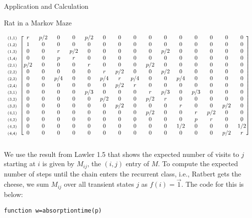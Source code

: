 \documentclass[12pt]{article}
\newcommand{\matindex}[1]{\mbox{\scriptsize#1}}
\numberwithin{equation}{section}
\begin{document}
\begin{section}{Application and Calculation}
\begin{subsection}{Rat in a Markov Maze}
\begin{enumerate}
\[{\begin{blockarray}{cccccccccccccccc}
        \begin{block}{c[ccccccccccccccc]}
        \matindex{(1,1)}&r&p/2&0&0&p/2&0&0&0&0&0&0&0&0&0&0\\
        \matindex{(1,2)}&1&0&0&0&0&0&0&0&0&0&0&0&0&0&0\\
        \matindex{(1,3)}&0&0&r&p/2&0&0&0&0&0&p/2&0&0&0&0&0\\
        \matindex{(1,4)}&0&0&p&r&0&0&0&0&0&0&0&0&0&0&0\\
        \matindex{(2,1)}&p/2&0&0&0&r&0&0&0&p/2&0&0&0&0&0&0\\
        \matindex{(2,2)}&0&0&0&0&0&r&p/2&0&0&p/2&0&0&0&0&0\\
        \matindex{(2,3)}&0&0&p/4&0&0&p/4&r&p/4&0&0&p/4&0&0&0&0\\
        \matindex{(2,4)}&0&0&0&0&0&0&p/2&r&0&0&0&0&0&0&0\\
        \matindex{(3,1)}&0&0&0&0&p/3&0&0&0&r&p/3&0&p/3&0&0&0\\
        \matindex{(3,2)}&0&0&0&0&0&p/2&0&0&p/2&r&0&0&0&0&0\\
        \matindex{(3,3)}&0&0&0&0&0&0&p/2&0&0&0&r&0&0&p/2&0\\
        \matindex{(4,1)}&0&0&0&0&0&0&0&0&p/2&0&0&r&p/2&0&0\\
        \matindex{(4,2)}&0&0&0&0&0&0&0&0&0&0&0&p&r&0&0\\
        \matindex{(4,3)}&0&0&0&0&0&0&0&0&0&0&1/2&0&0&0&1/2\\
        \matindex{(4,4)}&0&0&0&0&0&0&0&0&0&0&0&0&0&p/2&r\\
        \end{block}
        \end{blockarray}}\]

We use the result from Lawler 1.5 that shows the expected number of visits to $j$ starting at $i$ is given by $M_{ij}$, the $(i,j)$ entry of $M$. To compute the expected number of steps until the chain enters the recurrent class, i.e., Ratbert gets the cheese, we sum $M_{ij}$ over all transient states $j$ as $f(i)=\vec{1}$. The code for this is below:
\begin{lstlisting}
function w=absorptiontime(p)


\end{lstlisting}
\end{enumerate}
\end{subsection}
\end{section}
\end{document}
